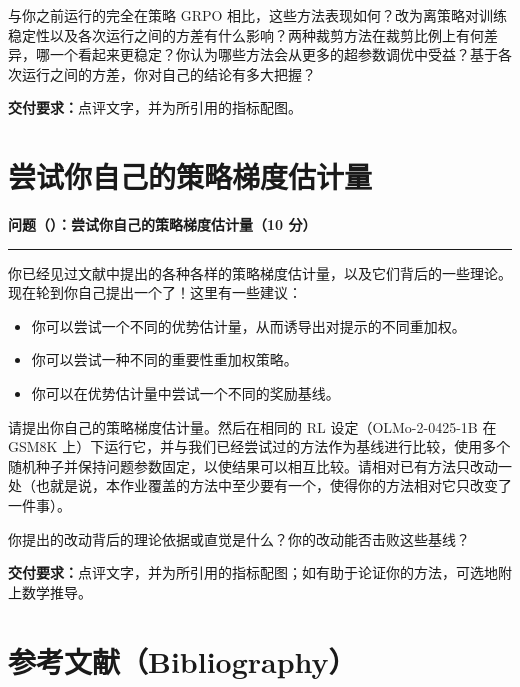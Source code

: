 与你之前运行的完全在策略 GRPO 相比，这些方法表现如何？改为离策略对训练稳定性以及各次运行之间的方差有什么影响？两种裁剪方法在裁剪比例上有何差异，哪一个看起来更稳定？你认为哪些方法会从更多的超参数调优中受益？基于各次运行之间的方差，你对自己的结论有多大把握？

\textbf{交付要求：}点评文字，并为所引用的指标配图。

\section{尝试你自己的策略梯度估计量}

\medskip
\noindent\textbf{问题（）：尝试你自己的策略梯度估计量（10 分）}
\par\nobreak\smallskip\hrule\nobreak\medskip

你已经见过文献中提出的各种各样的策略梯度估计量，以及它们背后的一些理论。现在轮到你自己提出一个了！这里有一些建议：
\begin{itemize}
  \item 你可以尝试一个不同的优势估计量，从而诱导出对提示的不同重加权。
  \item 你可以尝试一种不同的重要性重加权策略。
  \item 你可以在优势估计量中尝试一个不同的奖励基线。
\end{itemize}

请提出你自己的策略梯度估计量。然后在相同的 RL 设定（OLMo-2-0425-1B 在 GSM8K 上）下运行它，并与我们已经尝试过的方法作为基线进行比较，使用多个随机种子并保持问题参数固定，以使结果可以相互比较。请相对已有方法只改动一处（也就是说，本作业覆盖的方法中至少要有一个，使得你的方法相对它只改变了一件事）。

你提出的改动背后的理论依据或直觉是什么？你的改动能否击败这些基线？

\textbf{交付要求：}点评文字，并为所引用的指标配图；如有助于论证你的方法，可选地附上数学推导。

\section*{参考文献（Bibliography）}

